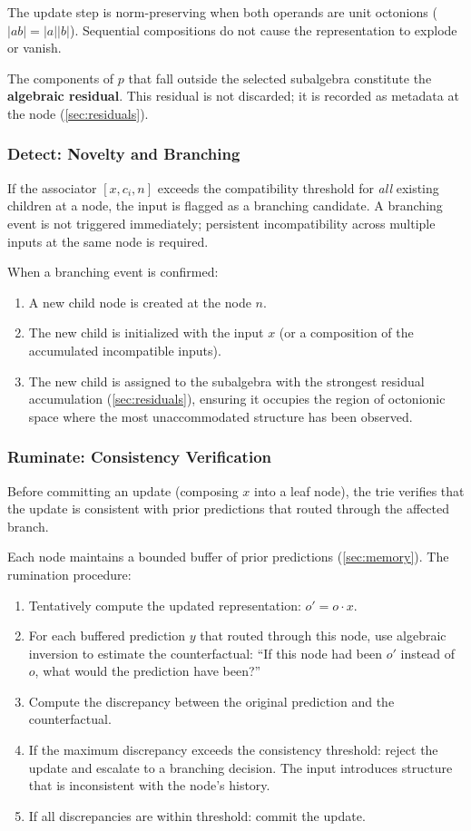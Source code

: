 \documentclass[11pt,a4paper]{article}
\theoremstyle{definition}
\theoremstyle{remark}
\begin{document}
The update step is norm-preserving when both operands are unit octonions ($\lvert ab \rvert = \lvert a \rvert \lvert b \rvert$). Sequential compositions do not cause the representation to explode or vanish.

The components of $p$ that fall outside the selected subalgebra constitute the \textbf{algebraic residual}. This residual is not discarded; it is recorded as metadata at the node (\cref{sec:residuals}).

\subsubsection{Detect: Novelty and Branching}

If the associator $[x, c_i, n]$ exceeds the compatibility threshold for \emph{all} existing children at a node, the input is flagged as a branching candidate. A branching event is not triggered immediately; persistent incompatibility across multiple inputs at the same node is required.

When a branching event is confirmed:
\begin{enumerate}[nosep]
  \item A new child node is created at the node $n$.
  \item The new child is initialized with the input $x$ (or a composition of the accumulated incompatible inputs).
  \item The new child is assigned to the subalgebra with the strongest residual accumulation (\cref{sec:residuals}), ensuring it occupies the region of octonionic space where the most unaccommodated structure has been observed.
\end{enumerate}

\subsubsection{Ruminate: Consistency Verification}

Before committing an update (composing $x$ into a leaf node), the trie verifies that the update is consistent with prior predictions that routed through the affected branch.

Each node maintains a bounded buffer of prior predictions (\cref{sec:memory}). The rumination procedure:
\begin{enumerate}[nosep]
  \item Tentatively compute the updated representation: $o' = o \cdot x$.
  \item For each buffered prediction $y$ that routed through this node, use algebraic inversion to estimate the counterfactual: ``If this node had been $o'$ instead of $o$, what would the prediction have been?''
  \item Compute the discrepancy between the original prediction and the counterfactual.
  \item If the maximum discrepancy exceeds the consistency threshold: reject the update and escalate to a branching decision. The input introduces structure that is inconsistent with the node's history.
  \item If all discrepancies are within threshold: commit the update.
\end{enumerate}
\end{document}
